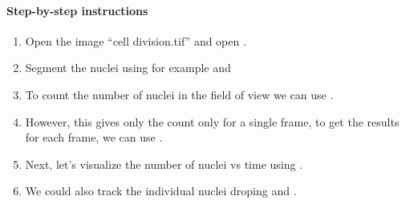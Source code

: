 \paragraph{Step-by-step instructions}

\begin{enumerate}
    \item Open the image ``cell division.tif'' and open .
    \item Segment the nuclei using for example  and 
    \item To count the number of nuclei in the field of view we can use  .
    \item However, this gives only the count only for a single frame, to get the results for each frame, we can use .
    \item Next, let's visualize the number of nuclei vs time using .
    \item We could also track the individual nuclei droping  and .
\end{enumerate}
